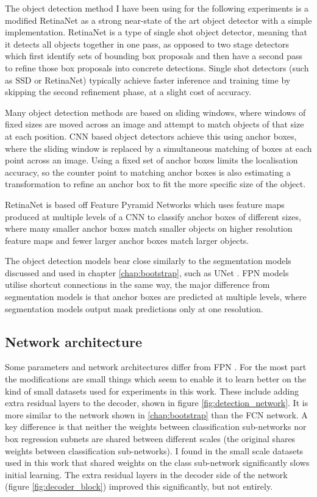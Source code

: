 The object detection method I have been using for the following experiments is a modified RetinaNet \cite{Lin2017} as a strong near-state of the art object detector with a simple implementation. RetinaNet is a type of single shot object detector, meaning that it detects all objects together in one pass, as opposed to two stage detectors which first identify sets of bounding box proposals and then have a second pass to refine those box proposals into concrete detections. Single shot detectors (such as \gls{SSD} \cite{Liu2016a} or RetinaNet) typically achieve faster inference and training time by skipping the second refinement phase, at a slight cost of accuracy.  

Many object detection methods are based on sliding windows, where windows of fixed sizes are moved across an image and attempt to match objects of that size at each position. \gls{CNN} based object detectors achieve this using anchor boxes, where the sliding window is replaced by a simultaneous matching of boxes at each point across an image. Using a fixed set of anchor boxes limits the localisation accuracy, so the counter point to matching anchor boxes is also estimating a transformation to refine an anchor box to fit the more specific size of the object.

RetinaNet is based off Feature Pyramid Networks \cite{Lin2017a} which uses feature maps produced at multiple levels of a \gls{CNN} to classify anchor boxes of different sizes, where many smaller anchor boxes match smaller objects on higher resolution feature maps and fewer larger anchor boxes match larger objects. 

The object detection models bear close similarly to the segmentation models discussed and used in chapter \ref{chap:bootstrap}, such as UNet \cite{Ronneberger2015}. \gls{FPN} models utilise shortcut connections in the same way, the major difference from segmentation models is that anchor boxes are predicted at multiple levels, where segmentation models output mask predictions only at one resolution.


\subsection {Network architecture}
\label{sec:architecture}

Some parameters and network architectures differ from \gls{FPN} \cite{Lin2017a}. For the most part the modifications are small things which seem to enable it to learn better on the kind of small datasets used for experiments in this work. These include adding extra residual layers to the decoder, shown in figure \ref{fig:detection_network}. It is more similar to the network shown in  \ref{chap:bootstrap} than the \gls{FCN} network. A key difference is that neither the weights between classification sub-networks nor box regression subnets are shared between different scales  (the original shares weights between classification sub-networks). I found in the small scale datasets used in this work that shared weights on the class sub-network significantly slows initial learning. The extra residual layers in the decoder side of the network (figure \ref{fig:decoder_block}) improved this significantly, but not entirely. 

